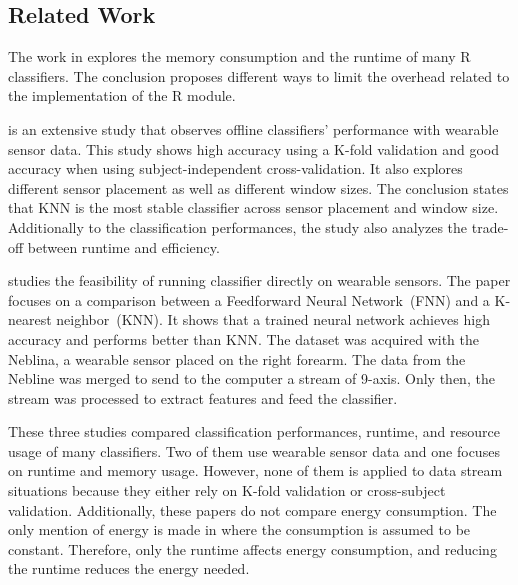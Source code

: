 
\subsection{Related Work}
The work in \cite{memory_consumption_machine_learning}
explores the memory consumption and
the runtime of many R classifiers. The conclusion proposes different ways to
limit the overhead related to the implementation of the R module.

\cite{Janidarmian_2017} is an extensive study that
observes offline classifiers' performance with
wearable sensor data. This study shows high
accuracy using a K-fold validation and good
accuracy when using subject-independent
cross-validation. It also explores different
sensor placement as well as different window
sizes. The conclusion states that KNN is the most
stable classifier across sensor placement and
window size. Additionally to the classification
performances, the study also analyzes the
trade-off between runtime and efficiency.

\cite{omid_2019} studies the feasibility of
running classifier directly on wearable sensors.
The paper focuses on a comparison between a
Feedforward Neural Network~(FNN) and a K-nearest
neighbor~(KNN). It shows that a trained neural
network achieves high accuracy and performs better
than KNN. The dataset was acquired with the
Neblina, a wearable sensor placed on the right
forearm. The data from the Nebline was merged to
send to the computer a stream of 9-axis. Only
then, the stream was processed to extract features
and feed the classifier.

These three studies compared classification
performances, runtime, and resource usage of many
classifiers. Two of them use wearable sensor data
and one focuses on runtime and memory usage.
However, none of them is applied to data stream
situations because they either rely on K-fold
validation or cross-subject validation.
Additionally, these papers do not compare energy
consumption. The only mention of energy is made in
\cite{omid_2019} where the consumption is assumed to be
constant. Therefore, only the runtime affects 
energy consumption, and reducing the runtime
reduces the energy needed.


